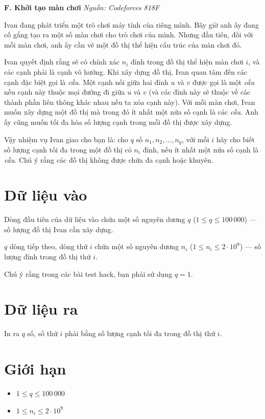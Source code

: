 \documentclass[12pt,a4paper]{article}
\newcommand{\problem}[2]{%
  \addcontentsline{toc}{section}{#1}%
  \begin{mdframed}[
    linecolor=framecolor,
    linewidth=1.5pt,
    backgroundcolor=white,
    topline=true, bottomline=true,
    leftline=true, rightline=true,
    innerleftmargin=10pt, innerrightmargin=10pt,
    innertopmargin=6pt, innerbottommargin=6pt,
  ]
  \textbf{\large #1} \hfill \textit{Nguồn: #2}
  \end{mdframed}
  \vspace{4pt}%
}
\begin{document}
\problem{F. Khởi tạo màn chơi}{Codeforces 818F}

Ivan đang phát triển một trò chơi máy tính của riêng mình. Bây giờ anh ấy đang cố gắng tạo ra một số màn chơi cho trò chơi của mình. Nhưng đầu tiên, đối với mỗi màn chơi, anh ấy cần vẽ một đồ thị thể hiện cấu trúc của màn chơi đó.

Ivan quyết định rằng sẽ có chính xác $n_i$ đỉnh trong đồ thị thể hiện màn chơi $i$, và các cạnh phải là cạnh vô hướng. Khi xây dựng đồ thị, Ivan quan tâm đến các cạnh đặc biệt gọi là \textit{cầu}. Một cạnh nối giữa hai đỉnh $u$ và $v$ được gọi là một \textit{cầu} nếu cạnh này thuộc mọi đường đi giữa $u$ và $v$ (và các đỉnh này sẽ thuộc về các thành phần liên thông khác nhau nếu ta xóa cạnh này). Với mỗi màn chơi, Ivan muốn xây dựng một đồ thị mà trong đó ít nhất một nửa số cạnh là các \textit{cầu}. Anh ấy cũng muốn tối đa hóa số lượng cạnh trong mỗi đồ thị được xây dựng.

Vậy nhiệm vụ Ivan giao cho bạn là: cho $q$ số $n_1, n_2, \dots, n_q$, với mỗi $i$ hãy cho biết số lượng cạnh tối đa trong một đồ thị có $n_i$ đỉnh, nếu ít nhất một nửa số cạnh là \textit{cầu}. Chú ý rằng các đồ thị không được chứa đa cạnh hoặc khuyên.

\section*{Dữ liệu vào}
Dòng đầu tiên của dữ liệu vào chứa một số nguyên dương $q$ ($1 \le q \le 100\,000$) — số lượng đồ thị Ivan cần xây dựng.

$q$ dòng tiếp theo, dòng thứ $i$ chứa một số nguyên dương $n_i$ ($1 \le n_i \le 2 \cdot 10^9$) — số lượng đỉnh trong đồ thị thứ $i$.

Chú ý rằng trong các bài test hack, bạn phải sử dụng $q = 1$.

\section*{Dữ liệu ra}
In ra $q$ số, số thứ $i$ phải bằng số lượng cạnh tối đa trong đồ thị thứ $i$.

\section*{Giới hạn}
\begin{constraintbox}
\begin{itemize}[leftmargin=*]
  \item $1 \le q \le 100\,000$
  \item $1 \le n_i \le 2 \cdot 10^9$
\end{itemize}
\end{constraintbox}
\end{document}
